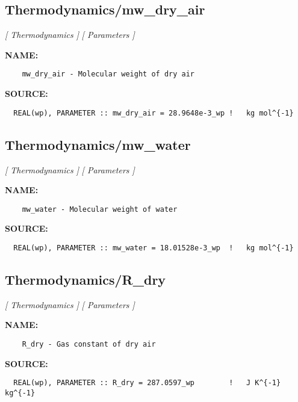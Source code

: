 \subsection{Thermodynamics/mw\_dry\_air}
\textsl{[ Thermodynamics ]}
\textsl{[ Parameters ]}

\label{ch:robo83}
\label{ch:Thermodynamics_mw_dry_air}
\textbf{NAME:}\hspace{0.08in}\begin{Verbatim}
    mw_dry_air - Molecular weight of dry air
\end{Verbatim}
\textbf{SOURCE:}\hspace{0.08in}\begin{Verbatim}
  REAL(wp), PARAMETER :: mw_dry_air = 28.9648e-3_wp !   kg mol^{-1}
\end{Verbatim}
\subsection{Thermodynamics/mw\_water}
\textsl{[ Thermodynamics ]}
\textsl{[ Parameters ]}

\label{ch:robo84}
\label{ch:Thermodynamics_mw_water}
\textbf{NAME:}\hspace{0.08in}\begin{Verbatim}
    mw_water - Molecular weight of water
\end{Verbatim}
\textbf{SOURCE:}\hspace{0.08in}\begin{Verbatim}
  REAL(wp), PARAMETER :: mw_water = 18.01528e-3_wp  !   kg mol^{-1}
\end{Verbatim}
\subsection{Thermodynamics/R\_dry}
\textsl{[ Thermodynamics ]}
\textsl{[ Parameters ]}

\label{ch:robo85}
\label{ch:Thermodynamics_R_dry}
\textbf{NAME:}\hspace{0.08in}\begin{Verbatim}
    R_dry - Gas constant of dry air
\end{Verbatim}
\textbf{SOURCE:}\hspace{0.08in}\begin{Verbatim}
  REAL(wp), PARAMETER :: R_dry = 287.0597_wp        !   J K^{-1} kg^{-1}
\end{Verbatim}
